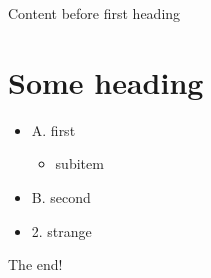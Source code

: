 \documentclass[11pt,a4paper]{article}
\begin{document}
Content before first heading

\section{Some heading}

\begin{itemize}
\item A. first
  \begin{itemize}
\item subitem
  \end{itemize}
\item B. second
\item 2. strange
\end{itemize}

The end!
\end{document}
